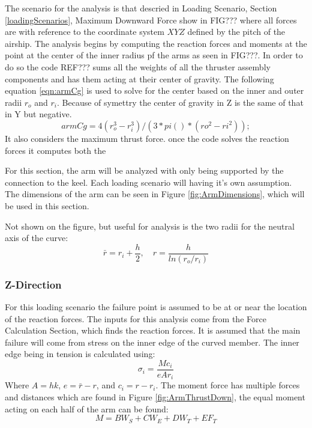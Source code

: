 \documentclass[../main.tex]{subfiles}
\begin{document}
The scenario for the analysis is that descried in Loading Scenario, Section \ref{loadingScenarios}, Maximum Downward Force show in FIG??? where all forces are with reference to the coordinate system $XYZ$ defined by the pitch of the airship. The analysis begins by computing the reaction forces and moments at the point at the center of the inner radius pf the arms as seen in FIG???. In order to do so the code REF??? sums all the weights of all the thruster assembly components and has them acting at their center of gravity. The following equation \ref{eqn:armCg} is used to solve for the center based on the inner and outer radii $r_o$ and $r_i$. Because of symettry the center of gravity in Z is the same of that in Y but negative. 
\begin{equation} \label{eqn:armCg}
armCg =4(r_o^3 - r_i^3)/(3*pi()*(ro^2 - ri^2));
\end{equation}
 It also considers the maximum thrust force. once the code solves the reaction forces it computes both the 

For this section, the arm will be analyzed with only being supported by the connection to the keel. Each loading scenario will having it's own assumption. The dimensions of the arm can be seen in Figure \ref{fig:ArmDimensions}, which will be used in this section.

Not shown on the figure, but useful for analysis is the two radii for the neutral axis of the curve:
\begin{equation} \label{eqn:CurveRs}
\bar{r} = r_i + \frac{h}{2}, \quad r = \frac{h}{ln(r_o/r_i)}
\end{equation}

\subsubsection{Z-Direction}
For this loading scenario the failure point is assumed to be at or near the location of the reaction forces. The inputs for this analysis come from the Force Calculation Section, which finds the reaction forces. It is assumed that the main failure will come from stress on the inner edge of the curved member. The inner edge being in tension is calculated using:
\begin{equation} \label{eqn:CurveStress}
\sigma _i = \frac{Mc_i}{eAr_i}
\end{equation}
Where $A = hk$, $e = \bar{r} - r$, and $c_i = r - r_i$. The moment force has multiple forces and distances which are found in Figure \ref{fig:ArmThrustDown}, the equal moment acting on each half of the arm can be found:
\begin{equation} \label{eqn:CurveMoment}
M = BW_{S} + CW_E + DW_T + EF_T 
\end{equation}
\end{document}
